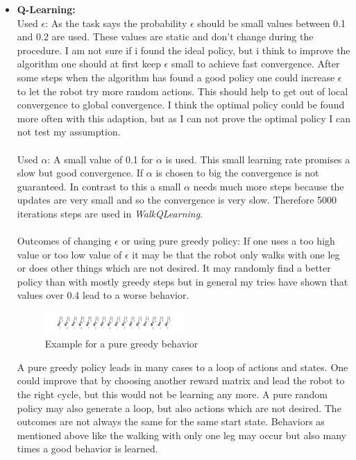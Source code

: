 \documentclass[conference]{IEEEtran}
\begin{document}
\begin{itemize}
\item \textbf{Q-Learning:}\\
Used $\epsilon$: As the task says the probability $\epsilon$ should be small values between 0.1 and 0.2 are used. These values are static and don't change during the procedure. I am not sure if i found the ideal policy, but i think to improve the algorithm one should at first keep $\epsilon$ small to achieve fast convergence. After some steps when the algorithm has found a good policy one could increase $\epsilon$ to let the robot try more random actions. This should help to get out of local convergence to global convergence. I think the optimal policy could be found more often with this adaption, but as I can not prove the optimal policy I can not test my assumption.\\
\\
Used $\alpha$: A small value of 0.1 for $\alpha$ is used. This small learning rate promises a slow but good convergence. If $\alpha$ is chosen to big the convergence is not guaranteed. In contrast to this a small $\alpha$ needs much more steps because the updates are very small and so the convergence is very slow. Therefore 5000 iterations steps are used in \textit{WalkQLearning}. \\
\\
Outcomes of changing $\epsilon$ or using pure greedy policy: If one uses a too high value or too low value of $\epsilon$ it may be that the robot only walks with one leg or does other things which are not desired. It may randomly find a better policy than with mostly greedy steps but in general my tries have shown that values over 0.4 lead to a worse behavior.
\begin{figure}[h!]
  	\centering
    \includegraphics[width=0.5\textwidth]{img/pure_greedy.png}
    \caption{Example for a pure greedy behavior}
    \label{fig:greedy}
\end{figure}
A pure greedy policy leads in many cases to a loop of actions and states. One could improve that by choosing another reward matrix and lead the robot to the right cycle, but this would not be learning any more. A pure random policy may also generate a loop, but also actions which are not desired. The outcomes are not always the same for the same start state. Behaviors as mentioned above like the walking with only one leg may occur but also many times a good behavior is learned.

\end{itemize}
\end{document}
